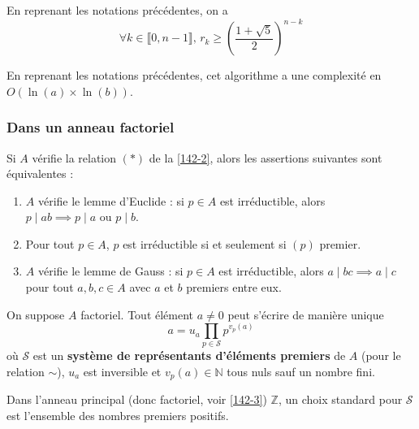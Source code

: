 
  \begin{proposition}
    En reprenant les notations précédentes, on a
    \[ \forall k \in \llbracket 0,n-1 \rrbracket, \, r_k \geq \left( \frac{1+\sqrt{5}}{2} \right)^{n-k} \]
  \end{proposition}

  \begin{corollary}
    En reprenant les notations précédentes, cet algorithme a une complexité en $O(\ln(a) \times \ln(b))$.
  \end{corollary}

  \subsubsection{Dans un anneau factoriel}


  \begin{proposition}
    Si $A$ vérifie la relation $(*)$ de la \cref{142-2}, alors les assertions suivantes sont équivalentes :
    \begin{enumerate}[label=(\roman*)]
      \item $A$ vérifie le lemme d'Euclide : si $p \in A$ est irréductible, alors $p \mid ab \implies p \mid a \text { ou } p \mid b$.
      \item Pour tout $p \in A$, $p$ est irréductible si et seulement si $(p)$ premier.
      \item $A$ vérifie le lemme de Gauss : si $p \in A$ est irréductible, alors $a \mid bc \implies a \mid c$ pour tout $a, b, c \in A$ avec $a$ et $b$ premiers entre eux.
    \end{enumerate}
  \end{proposition}


  \begin{proposition}
    \label{142-2}
    On suppose $A$ factoriel. Tout élément $a \neq 0$ peut s'écrire de manière unique
    \[ a = u_a \prod_{p \in \mathcal{S}} p^{v_p(a)} \tag{$*$} \]
    où $\mathcal{S}$ est un \textbf{système de représentants d'éléments premiers} de $A$ (pour le relation $\sim$), $u_a$ est inversible et $v_p(a) \in \mathbb{N}$ tous nuls sauf un nombre fini.
  \end{proposition}

  \begin{example}
    Dans l'anneau principal (donc factoriel, voir \cref{142-3}) $\mathbb{Z}$, un choix standard pour $\mathcal{S}$ est l'ensemble des nombres premiers positifs.
  \end{example}

